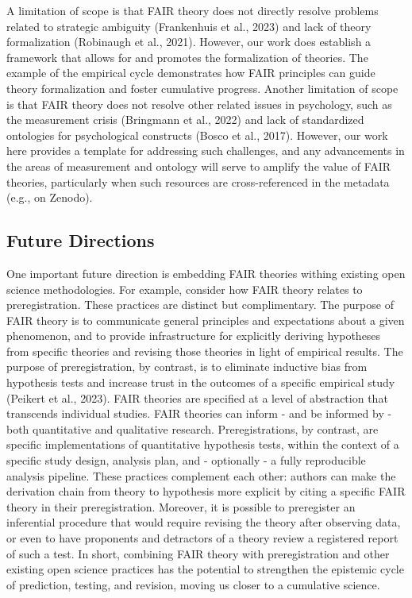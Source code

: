 \documentclass[
  man, noextraspace,floatsintext]{apa7}
\begin{document}
A limitation of scope is that FAIR theory does not directly resolve problems related to strategic ambiguity (Frankenhuis et al., 2023) and lack of theory formalization (Robinaugh et al., 2021).
However, our work does establish a framework that allows for and promotes the formalization of theories.
The example of the empirical cycle demonstrates how FAIR principles can guide theory formalization and foster cumulative progress.
Another limitation of scope is that FAIR theory does not resolve other related issues in psychology, such as the measurement crisis (Bringmann et al., 2022) and lack of standardized ontologies for psychological constructs (Bosco et al., 2017).
However, our work here provides a template for addressing such challenges,
and any advancements in the areas of measurement and ontology will serve to amplify the value of FAIR theories, particularly when such resources are cross-referenced in the metadata (e.g., on Zenodo).

\subsection{Future Directions}\label{future-directions}

\label{fairtheoryprereg}{One important future direction is embedding FAIR theories withing existing open science methodologies.
For example, consider how FAIR theory relates to preregistration.
These practices are distinct but complimentary.
The purpose of FAIR theory is to communicate general principles and expectations about a given phenomenon,
and to provide infrastructure for explicitly deriving hypotheses from specific theories and revising those theories in light of empirical results.
The purpose of preregistration, by contrast, is to eliminate inductive bias from hypothesis tests and increase trust in the outcomes of a specific empirical study (Peikert et al., 2023).
FAIR theories are specified at a level of abstraction that transcends individual studies.
FAIR theories can inform - and be informed by - both quantitative and qualitative research.
Preregistrations, by contrast, are specific implementations of quantitative hypothesis tests,
within the context of a specific study design, analysis plan, and - optionally - a fully reproducible analysis pipeline.
These practices complement each other:
authors can make the derivation chain from theory to hypothesis more explicit by citing a specific FAIR theory in their preregistration.
Moreover, it is possible to preregister an inferential procedure that would require revising the theory after observing data,
or even to have proponents and detractors of a theory review a registered report of such a test.
In short, combining FAIR theory with preregistration and other existing open science practices has the potential to strengthen the epistemic cycle of prediction, testing, and revision, moving us closer to a cumulative science.}
\end{document}
